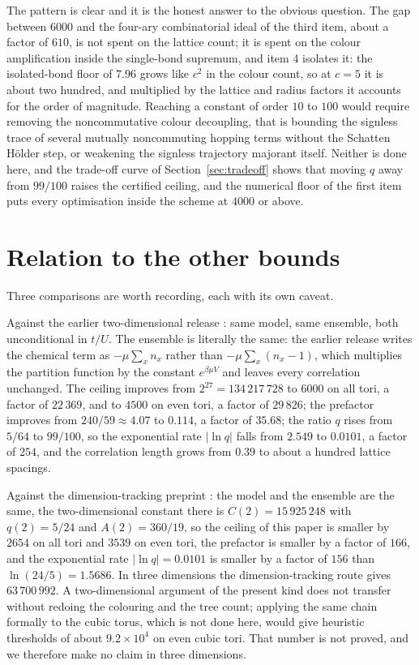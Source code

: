 \documentclass[11pt]{article}
\theoremstyle{plain}
\theoremstyle{definition}
\begin{document}
The pattern is clear and it is the honest answer to the obvious question. The gap
between $6000$ and the four-ary combinatorial ideal of the third item, about a factor
of $610$, is not spent on the lattice count; it is spent on the colour amplification
inside the single-bond supremum, and item 4 isolates it: the isolated-bond floor of
$7.96$ grows like $c^{2}$ in the colour count, so at $c=5$ it is about two hundred,
and multiplied by the lattice and radius factors it accounts for the order of
magnitude. Reaching a constant of order $10$ to $100$ would require removing the
noncommutative colour decoupling, that is bounding the signless trace of several
mutually noncommuting hopping terms without the Schatten H\"older step, or weakening
the signless trajectory majorant itself. Neither is done here, and the trade-off
curve of Section~\ref{sec:tradeoff} shows that moving $q$ away from $99/100$ raises
the certified ceiling, and the numerical floor of the first item puts every
optimisation inside the scheme at $4000$ or above.

\section{Relation to the other bounds}\label{sec:relation}

Three comparisons are worth recording, each with its own caveat.

Against the earlier two-dimensional release \cite{rens2026a}: same model, same ensemble,
both unconditional in $t/U$. The ensemble is literally the same: the earlier release
writes the chemical term as $-\mu\sum_x n_x$ rather than
$-\mu\sum_x(n_x-1)$, which multiplies the partition function by the constant
$e^{\beta\mu V}$ and leaves every correlation unchanged. The ceiling improves from
$2^{27}=134\,217\,728$ to $6000$ on all tori, a factor of $22\,369$, and to $4500$ on
even tori, a factor of $29\,826$; the prefactor improves from $240/59\approx4.07$ to
$0.114$, a factor of $35.68$; the ratio $q$ rises from $5/64$ to $99/100$, so the
exponential rate $|\ln q|$ falls from $2.549$ to $0.0101$, a factor of $254$, and the
correlation length grows from $0.39$ to about a hundred lattice spacings.

Against the dimension-tracking preprint \cite{rens2026b}: the model and the ensemble
are the same, the two-dimensional constant there is $C(2)=15\,925\,248$ with
$q(2)=5/24$ and $A(2)=360/19$, so the ceiling of this paper is smaller by $2654$ on
all tori and $3539$ on even tori, the prefactor is smaller by a factor of $166$, and
the exponential rate $|\ln q|=0.0101$ is smaller by a factor of $156$ than
$\ln(24/5)=1.5686$. In three dimensions the dimension-tracking
route gives $63\,700\,992$. A two-dimensional argument of the present kind does not
transfer without redoing the colouring and the tree count; applying the same chain
formally to the cubic torus, which is not done here, would give heuristic thresholds
of about $9.2\times10^{4}$ on even cubic tori. That number is not proved, and we
therefore make no claim in three dimensions.
\end{document}
